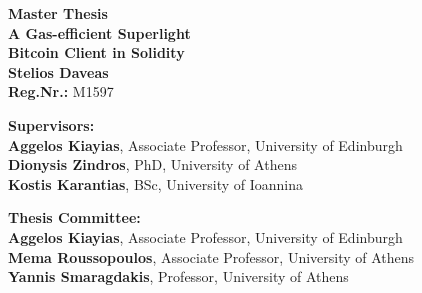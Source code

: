 \begin{center}
    \vspace{3cm}
    \large \textbf{Master Thesis}\\
    \vspace{3cm}
    \textbf{A Gas-efficient Superlight\\Bitcoin Client in Solidity}\\
    \vspace{3cm}
    \large \textbf{Stelios Daveas}\\
    \textbf{Reg.Nr.:} M1597

    \vspace{7cm}
    \begin{flushleft}
        \textbf{Supervisors:}\\
        \hspace{2cm}
        \textbf{Aggelos Kiayias}, Associate Professor, University of Edinburgh\\
        \hspace{2cm}
        \textbf{Dionysis Zindros}, PhD, University of Athens\\
        \hspace{2cm}
        \textbf{Kostis Karantias}, BSc, University of Ioannina

        \vspace{1cm}

        \textbf{Thesis Committee:}\\
        \hspace{2cm}
        \textbf{Aggelos Kiayias}, Associate Professor, University of Edinburgh\\
        \hspace{2cm}
        \textbf{Mema Roussopoulos}, Associate Professor, University of Athens\\
        \hspace{2cm}
        \textbf{Yannis Smaragdakis}, Professor, University of Athens

    \end{flushleft}
\end{center}


\pagebreak
